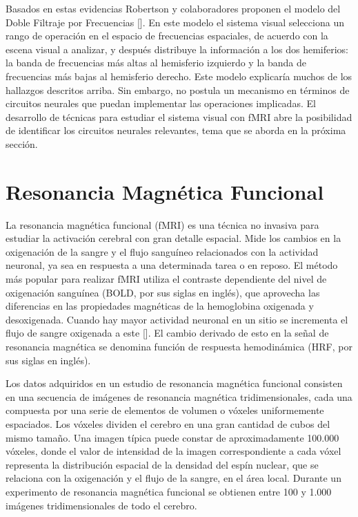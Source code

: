 Basados en estas evidencias Robertson y colaboradores proponen el modelo del Doble Filtraje por Frecuencias [\cite{robertson_hemispheric_2000}]. En este modelo el sistema visual selecciona un rango de operación en el espacio de frecuencias espaciales, de acuerdo con la escena visual a analizar, y después distribuye la información a los dos hemiferios: la banda de frecuencias más altas al hemisferio izquierdo y la banda de frecuencias más bajas al hemisferio derecho. Este modelo explicaría muchos de los hallazgos descritos arriba. Sin embargo, no postula un mecanismo en términos de circuitos neurales que puedan implementar las operaciones implicadas. El desarrollo de técnicas para estudiar el sistema visual con fMRI abre la posibilidad de identificar los circuitos neurales relevantes, tema que se aborda en la próxima sección.

\section{Resonancia Magn\'etica Funcional}

La resonancia magnética funcional (fMRI) es una técnica no invasiva para estudiar la activación cerebral con gran detalle espacial. Mide los cambios en la oxigenación de la sangre y el flujo sanguíneo relacionados con la actividad neuronal, ya sea en respuesta a una determinada tarea o en reposo. El método más popular para realizar fMRI utiliza el contraste dependiente del nivel de oxigenación sanguínea (BOLD, por sus siglas en ingl\'es), que aprovecha las diferencias en las propiedades magnéticas de la hemoglobina oxigenada y desoxigenada. Cuando hay mayor actividad neuronal en un sitio se incrementa el flujo de sangre oxigenada a este [\cite{lindquist_principles_nodate}]. El cambio derivado de esto en la señal de resonancia magnética se denomina función de respuesta hemodinámica (HRF, por sus siglas en ingl\'es).

Los datos adquiridos en un estudio de resonancia magnética funcional consisten en una secuencia de imágenes de resonancia magnética tridimensionales, cada una compuesta por una serie de elementos de volumen o vóxeles uniformemente espaciados. Los vóxeles dividen el cerebro en una gran cantidad de cubos del mismo tamaño. Una imagen típica puede constar de aproximadamente 100.000 vóxeles, donde el valor de intensidad de la imagen correspondiente a cada vóxel representa la distribución espacial de la densidad del espín nuclear, que se relaciona con la oxigenación y el flujo de la sangre, en el área local. Durante un experimento de resonancia magnética funcional se obtienen entre 100 y 1.000 imágenes tridimensionales de todo el cerebro. 

